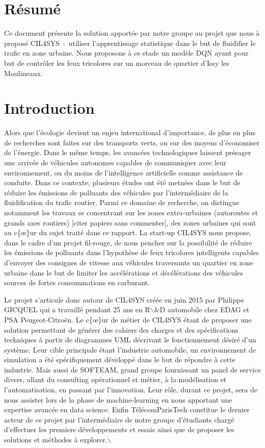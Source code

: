 \documentclass[11pt]{article}
\author{Thomas}
\date{\today}
\title{}
\begin{document}
\tableofcontents


\section{Résumé}
\label{sec:orgddbb1cf}

Ce document présente la solution apportée par notre groupe au projet que nous à proposé CIL4SYS : utiliser l'apprentissage statistique dans le but de fluidifier le trafic en zone urbaine. Nous proposons à ce stade un modèle DQN ayant pour but de contrôler les feux tricolores sur un morceau de quartier d'Issy les Moulineaux.

\section{Introduction}
\label{sec:orge484377}

Alors que l'écologie devient un enjeu international d'importance, de plus en plus de recherches sont faites sur des transports verts, ou sur des moyens d'économiser de l'énergie. Dans le même temps, les avancées technologiques laissent présager une arrivée de véhicules autonomes capables de communiquer avec leur environnement, ou du moins de l'intelligence artificielle comme assistance de conduite. Dans ce contexte, plusieurs études ont été metnées dans le but de réduire les émissions de polluants des véhicules par l'intermédiaire de la fluidification du trafic routier. Parmi ce domaine de recherche, on distingue notamment les travaux se concentrant sur les zones extra-urbaines (autoroutes et grands axes routiers) [citer papiers sans commenter], des zones urbaines qui sont au c\{\oe\}ur du sujet traité dans ce rapport. La start-up CIL4SYS nous propose, dans le cadre d'un projet fil-rouge, de nous pencher sur la possibilité de réduire les émissions de polluants dans l'hypothèse de feux tricolores intelligents capables d'envoyer des consignes de vitesse aux véhicules traversants un quartier en zone urbaine dans le but de limiter les accélérations et décélérations des véhicules sources de fortes consommations en carburant.

Le projet s'articule donc autour de CIL4SYS créée en juin 2015 par Philippe GICQUEL qui a travaillé pendant 25 ans en R$\backslash$&D automobile chez EDAG et PSA Peugeot-Citroën. Le c\{\oe\}ur de métier de CIL4SYS étant de proposer une solution permettant de générer des cahiers des charges et des spécifications techniques à partir de diagrammes UML décrivant le fonctionnement désiré d'un système. Leur cible principale étant l'industrie automobile, un environnement de simulation a été spécifiquement développé dans le but de répondre à cette industrie. Mais aussi de SOFTEAM, grand groupe fournissant un panel de service divers, allant du consulting opérationnel et métier, à la modélisation et l'automatisation, en passant par l'innovation. Leur rôle, durant ce projet, sera de nous assister lors de la phase de machine-learning en nous apportant une expertise avancée en data science. Enfin TélécomParisTech constitue le dernier acteur de ce projet par l'intermédiaire de notre groupe d'étudiants chargé d'effectuer les premiers développements et essais ainsi que de proposer les solutions et méthodes à explorer.$\backslash$
\end{document}
